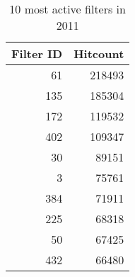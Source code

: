 \documentclass{sigchi}
\begin{document}
\begin{table}
  \centering
  \begin{tabular}{r r }
    Filter ID & Hitcount \\  
    \hline
    61 & 218493 \\
    135 & 185304 \\
    172 & 119532 \\
    402 & 109347 \\
    30 & 89151 \\
    3 & 75761 \\
    384 & 71911 \\
    225 & 68318 \\
    50 & 67425 \\
    432 & 66480 \\
  \end{tabular}
  \caption{10 most active filters in 2011}~\label{tab:most-active-2011}
\end{table}

\begin{comment}

==> quarry-32493-en-wp_-all-abuse-filter-log-entries-in-2012-run318778.csv <==
afl_filter,count(*)
135,173830
384,144202
432,126156
172,105082
30,93718
3,90724
380,67814
351,59226
279,58853
225,58352

==> quarry-32495-en-wp_-all-abuse-filter-log-entries-in-2013-run318779.csv <==
afl_filter,count(*)
135,133309
384,129807
432,94017
172,92871
30,85722
279,76738
3,70067
380,58668
491,55454
225,48390

==> quarry-32496-en-wp_-all-abuse-filter-log-entries-in-2014-run318780.csv <==
afl_filter,count(*)
384,111570
135,111173
279,97204
172,82042
432,75839
30,62495
3,60656
636,52639
231,39693
380,39624

==> quarry-32497-en-wp_-all-abuse-filter-log-entries-in-2015-run318782.csv <==
afl_filter,count(*)
650,226460
61,196986
636,191320
527,189911
633,162319
384,141534
279,110137
135,99057
686,95356
172,82874

==> quarry-32499-en-wp_-all-abuse-filter-log-entries-in-2016-run318789.csv <==
afl_filter,count(*)
527,437099
61,274945
650,229083
633,218696
636,179948
384,179871
279,106699
135,95131
172,79843
30,68968

==> quarry-32500-en-wp_-all-abuse-filter-log-entries-in-2017-run318797.csv <==
afl_filter,count(*)
61,250394
633,218146
384,200748
527,192441
636,156409
650,151604
135,80056
172,70837
712,59537
833,58133

==> quarry-32503-en-wp_-all-abuse-filter-log-entries-in-2018-run318831.csv <==
afl_filter,count(*)
527,358210
61,234867
633,201400
384,177543
833,161030
636,144674
650,79381
135,75348
686,70550
172,64266
\end{comment}
\end{document}
